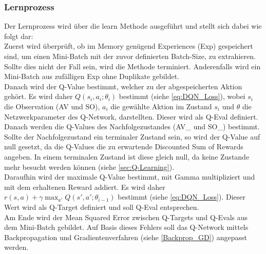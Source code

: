 \subsubsection{Lernprozess} \label{sec:Konzept_Lernprozess_DQN}
Der Lernprozess wird über die learn Methode ausgeführt und stellt sich dabei wie folgt dar:\\
Zuerst wird überprüft, ob im Memory genügend Experiences (Exp) gespeichert sind, um einen Mini-Batch mit der zuvor definierten Batch-Size, zu extrahieren. Sollte dies nicht der Fall sein, wird die Methode terminiert. Anderenfalls wird ein Mini-Batch aus zufälligen Exp ohne Duplikate gebildet.\\
Danach wird der Q-Value bestimmt, welcher zu der abgespeicherten Aktion gehört. Es wird daher $Q(s_i,a_i;\theta_i)$ bestimmt (siehe \ref{eq:DQN_Loss}), wobei $s_i$ die Observation (AV und SO), $a_i$ die gewählte Aktion im Zustand $s_i$ und $\theta$ die Netzwerkparameter des Q-Network, darstellten. Dieser wird als Q-Eval definiert.\\
Danach werden die Q-Values des Nachfolgezustandes (AV\_ und SO\_) bestimmt. Sollte der Nachfolgezustand ein terminaler Zustand sein, so wird der Q-Value auf null gesetzt, da die Q-Values die zu erwartende Discounted Sum of Rewards angeben. In einem terminalen Zustand ist diese gleich null, da keine Zustande mehr besucht werden können (siehe \ref{sec:Q-Learning}).\\
Daraufhin wird der maximale Q-Value bestimmt, mit Gamma multipliziert und mit dem erhaltenen Reward addiert. Es wird daher $r(s,a) + \gamma \max_{a'}Q(s',a';\theta_{i-1})$ bestimmt (siehe \ref{eq:DQN_Loss}). Dieser Wert wird als Q-Target definiert und soll Q-Eval entsprechen.\\
Am Ende wird der Mean Squared Error zwischen Q-Targets und Q-Evals aus dem Mini-Batch gebildet. Auf Basis dieses Fehlers soll das Q-Network mittels Backpropagation und Gradientenverfahren (siehe \ref{Backprop_GD}) angepasst werden.

